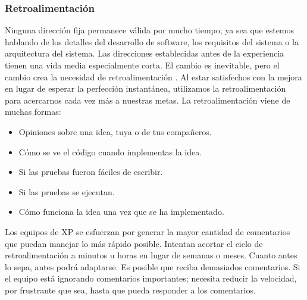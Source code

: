 \begin{spacing}{1.5}
		\subsubsection{Retroalimentaci\'{o}n}
		Ninguna dirección fija permanece válida por mucho tiempo; ya sea que estemos hablando de los detalles del desarrollo de software, los requisitos del sistema o la arquitectura del sistema. Las direcciones establecidas antes de la experiencia tienen una vida media especialmente corta. El cambio es inevitable, pero el cambio crea la necesidad de retroalimentación \cite{chap2_extreme_programming}.
		Al estar satisfechos con la mejora en lugar de esperar la perfección instantánea, utilizamos la retroalimentación para acercarnos cada vez más a nuestras metas. La retroalimentación viene de muchas formas:
		\begin{itemize}
			\item Opiniones sobre una idea, tuya o de tus compañeros.
			\item Cómo se ve el código cuando implementas la idea.
			\item Si las pruebas fueron fáciles de escribir.
			\item Si las pruebas se ejecutan.
			\item Cómo funciona la idea una vez que se ha implementado.
		\end{itemize}
		Los equipos de XP se esfuerzan por generar la mayor cantidad de comentarios que puedan manejar lo más rápido posible. Intentan acortar el ciclo de retroalimentación a minutos u horas en lugar de semanas o meses. Cuanto antes lo sepa, antes podrá adaptarse. Es posible que reciba demasiados comentarios. Si el equipo está ignorando comentarios importantes; necesita reducir la velocidad, por frustrante que sea, hasta que pueda responder a los comentarios.

\end{spacing}
